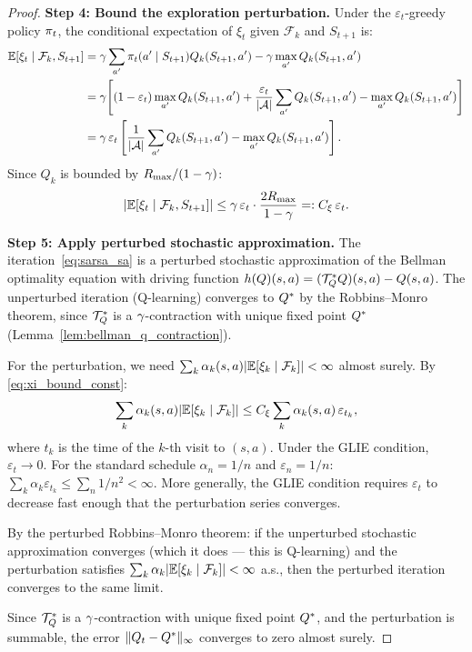 \documentclass[11pt,a4paper]{article}
\begin{document}
\begin{proof}
\textbf{Step 4: Bound the exploration perturbation.}
Under the $\varepsilon_t$-greedy policy $\pi_t$, the conditional
expectation of $\xi_t$ given $\mathcal{F}_k$ and $S_{t+1}$ is:
\begin{align}
  \mathbb{E}[\xi_t \mid \mathcal{F}_k, S_{t+1}]
  &= \gamma \sum_{a'} \pi_t(a' \mid S_{t+1}) Q_k(S_{t+1}, a')
     - \gamma \max_{a'} Q_k(S_{t+1}, a') \nonumber\\
  &= \gamma\!\left[
    (1-\varepsilon_t) \max_{a'} Q_k(S_{t+1}, a')
    + \frac{\varepsilon_t}{|\mathcal{A}|}
      \sum_{a'} Q_k(S_{t+1}, a')
    - \max_{a'} Q_k(S_{t+1}, a')
  \right] \nonumber\\
  &= \gamma\,\varepsilon_t \left[
    \frac{1}{|\mathcal{A}|} \sum_{a'} Q_k(S_{t+1}, a')
    - \max_{a'} Q_k(S_{t+1}, a')
  \right].
  \label{eq:xi_bound}
\end{align}
Since $Q_k$ is bounded by $R_{\max}/(1-\gamma)$:
\begin{equation}
  |\mathbb{E}[\xi_t \mid \mathcal{F}_k, S_{t+1}]|
  \leq \gamma\,\varepsilon_t \cdot
  \frac{2R_{\max}}{1 - \gamma}
  =: C_\xi\,\varepsilon_t.
  \label{eq:xi_bound_const}
\end{equation}

\textbf{Step 5: Apply perturbed stochastic approximation.}
The iteration~\eqref{eq:sarsa_sa} is a perturbed stochastic
approximation of the Bellman optimality equation with driving
function $h(Q)(s,a) = (\mathcal{T}^*_Q Q)(s,a) - Q(s,a)$. The
unperturbed iteration (Q-learning) converges to $Q^*$ by the
Robbins--Monro theorem, since $\mathcal{T}^*_Q$ is a
$\gamma$-contraction with unique fixed point $Q^*$
(Lemma~\ref{lem:bellman_q_contraction}).

For the perturbation, we need $\sum_k \alpha_k(s,a)
|\mathbb{E}[\xi_k \mid \mathcal{F}_k]| < \infty$ almost surely. By
\eqref{eq:xi_bound_const}:
\begin{equation}
  \sum_k \alpha_k(s,a) |\mathbb{E}[\xi_k \mid \mathcal{F}_k]|
  \leq C_\xi \sum_k \alpha_k(s,a)\,\varepsilon_{t_k},
  \label{eq:perturbation_sum}
\end{equation}
where $t_k$ is the time of the $k$-th visit to $(s,a)$. Under the
GLIE condition, $\varepsilon_t \to 0$. For the standard schedule
$\alpha_n = 1/n$ and $\varepsilon_n = 1/n$:
$\sum_k \alpha_k \varepsilon_{t_k} \leq \sum_n 1/n^2 < \infty$.
More generally, the GLIE condition requires $\varepsilon_t$
to decrease fast enough that the perturbation series converges.

By the perturbed Robbins--Monro theorem: if the unperturbed
stochastic approximation converges (which it does --- this is
Q-learning) and the perturbation satisfies
$\sum_k \alpha_k |\mathbb{E}[\xi_k \mid \mathcal{F}_k]| < \infty$ a.s.,
then the perturbed iteration converges to the same limit.

Since $\mathcal{T}^*_Q$ is a $\gamma$-contraction with unique
fixed point $Q^*$, and the perturbation is summable, the error
$\|Q_t - Q^*\|_\infty$ converges to zero almost surely.
\end{proof}
\end{document}
